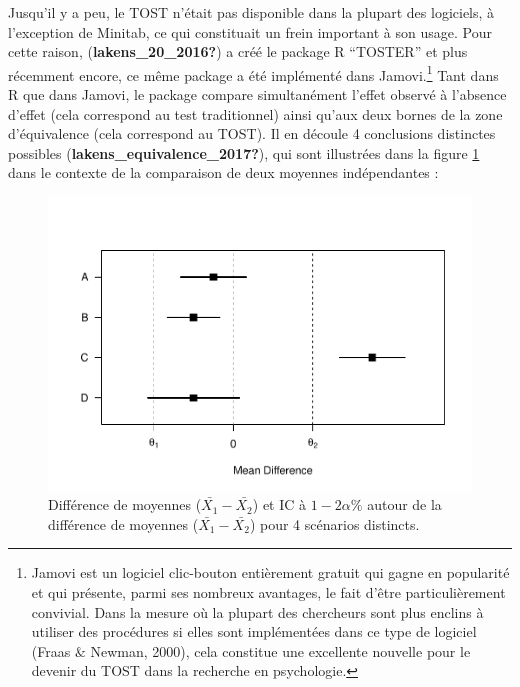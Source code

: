 \documentclass[
  english,
  man]{apa6}
\begin{document}
Jusqu'il y a peu, le TOST n'était pas disponible dans la plupart des logiciels, à l'exception de Minitab, ce qui constituait un frein important à son usage. Pour cette raison, (\textbf{lakens\_20\_2016?}) a créé le package R ``TOSTER'' et plus récemment encore, ce même package a été implémenté dans Jamovi.\footnote{Jamovi est un logiciel clic-bouton entièrement gratuit qui gagne en popularité et qui présente, parmi ses nombreux avantages, le fait d'être particulièrement convivial. Dans la mesure où la plupart des chercheurs sont plus enclins à utiliser des procédures si elles sont implémentées dans ce type de logiciel (Fraas $\&$ Newman, 2000), cela constitue une excellente nouvelle pour le devenir du TOST dans la recherche en psychologie.} Tant dans R que dans Jamovi, le package compare simultanément l'effet observé à l'absence d'effet (cela correspond au test traditionnel) ainsi qu'aux deux bornes de la zone d'équivalence (cela correspond au TOST). Il en découle 4 conclusions distinctes possibles (\textbf{lakens\_equivalence\_2017?}), qui sont illustrées dans la figure \ref{fig:equiv1} dans le contexte de la comparaison de deux moyennes indépendantes :

\begin{figure}

{\centering \includegraphics[width=0.8\linewidth]{chp5_format-Rmd_bib_files/figure-latex/equiv1-1} 

}

\caption{Différence de moyennes ($\bar{X_1}-\bar{X_2}$) et IC à $1-2\alpha\%$ autour de la différence de moyennes ($\bar{X_1}-\bar{X_2}$) pour 4 scénarios distincts.}\label{fig:equiv1}
\end{figure}
\end{document}
